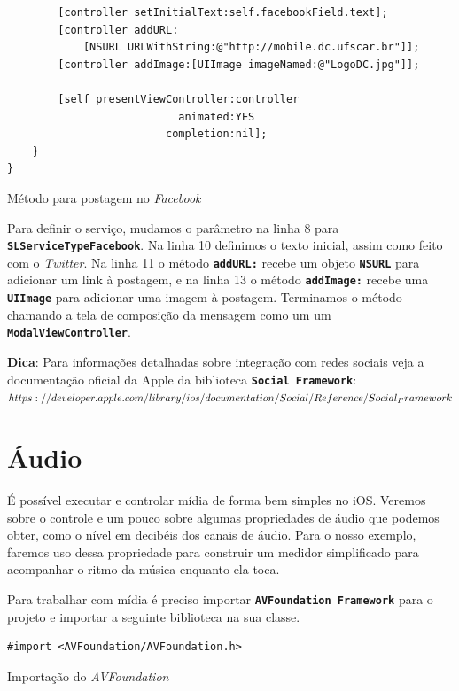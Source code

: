 \documentclass[a4paper,12pt,brazil,doubleside]{book}
\begin{document}
\begin{singlespace}
\begin{listing}[H]
\begin{verbatim}
        [controller setInitialText:self.facebookField.text];
        [controller addURL:
            [NSURL URLWithString:@"http://mobile.dc.ufscar.br"]];
        [controller addImage:[UIImage imageNamed:@"LogoDC.jpg"]];

        [self presentViewController:controller
                           animated:YES
                         completion:nil];
    }
}
\end{verbatim}
\caption{Método para postagem no \emph{Facebook}}
\end{listing}


Para definir o serviço, mudamos o parâmetro na linha 8 para \texttt{\textbf{SLServiceTypeFacebook}}. Na linha 10 definimos o texto inicial, assim como feito com o \emph{Twitter}. Na linha 11 o método \texttt{\textbf{addURL:}} recebe um objeto \texttt{\textbf{NSURL}} para adicionar um link à postagem, e na linha 13 o método \texttt{\textbf{addImage:}} recebe uma \texttt{\textbf{UIImage}} para adicionar uma imagem à postagem. Terminamos o método chamando a tela de composição da mensagem como um um \texttt{\textbf{ModalViewController}}.

\begin{framed}

\textbf{Dica}: Para informações detalhadas sobre integração com redes sociais veja a documentação oficial da Apple da biblioteca \texttt{\textbf{Social Framework}}:\\
\(https://developer.apple.com/library/ios/documentation/Social/Reference/\\Social_Framework\)
\end{framed}

\section{Áudio}


É possível executar e controlar mídia de forma bem simples no iOS. Veremos sobre o controle e um pouco sobre algumas propriedades de áudio que podemos obter, como o nível em decibéis dos canais de áudio. Para o nosso exemplo, faremos uso dessa propriedade para construir um medidor simplificado para acompanhar o ritmo da música enquanto ela toca.

Para trabalhar com mídia é preciso importar \texttt{\textbf{AVFoundation Framework}} para o projeto e importar a seguinte biblioteca na sua classe.

\begin{listing}[H]
\begin{verbatim}
#import <AVFoundation/AVFoundation.h>
\end{verbatim}
\caption{Importação do \emph{AVFoundation}}
\end{listing}



\end{singlespace}
\end{document}
